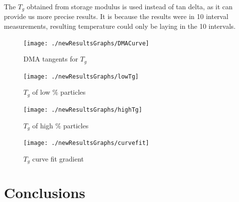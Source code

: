 \documentclass[numbers=noendperiod,chapterprefix=on]{icldt} %
\begin{document}
{The $T_g$ obtained from storage modulus is used instead of tan delta, as it can provide us more precise results. It is because the results were in 10 interval measurements, resulting temperature could only be laying in the 10 intervals.   


\begin{figure}[!hp]
\centering
\texttt{[image: ./newResultsGraphs/DMACurve]}
\caption{DMA tangents for $T_g$}\label{DMACurve}
\end{figure}
\FloatBarrier

\begin{figure}[!hp]
\centering
\texttt{[image: ./newResultsGraphs/lowTg]}
\caption {$T_g$ of low \% particles}\label{low $T_{g}$}
\end{figure}
\FloatBarrier

\begin{figure}[!hp]
\centering
\texttt{[image: ./newResultsGraphs/highTg]}
\caption {$T_g$ of high \% particles}\label{high$ T_{g} $}
\end{figure}
\FloatBarrier

\begin{figure}[!hp]
\centering
\texttt{[image: ./newResultsGraphs/curvefit]}
\caption {$T_g$ curve fit gradient}\label{curvefit}
\end{figure}
\FloatBarrier

\chapter{Conclusions}

}
\end{document}
